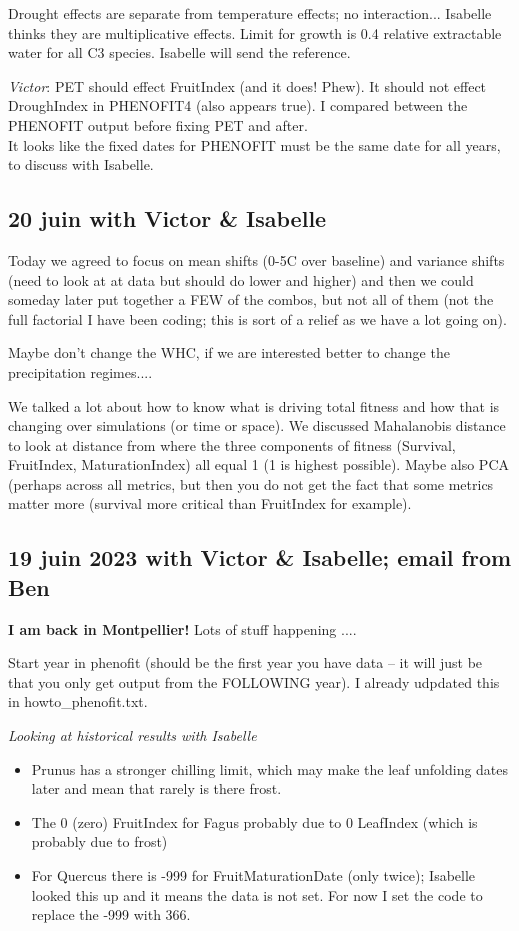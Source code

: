 \documentclass[11pt,letter]{article}
\begin{document}
Drought effects are separate from temperature effects; no interaction... Isabelle thinks they are multiplicative effects. Limit for growth is 0.4 relative extractable water for all C3 species. Isabelle will send the reference. 

\emph{Victor}:
PET should effect FruitIndex (and it does! Phew). It should not effect DroughIndex in PHENOFIT4 (also appears true). I compared between the PHENOFIT output before fixing PET and after. \\
It looks like the fixed dates for PHENOFIT must be the same date for all years, to discuss with Isabelle.\\

\subsection{20 juin with Victor \& Isabelle}

Today we agreed to focus on mean shifts (0-5C over baseline) and variance shifts (need to look at at data but should do lower and higher) and then we could someday later put together a FEW of the combos, but not all of them (not the full factorial I have been coding; this is sort of a relief as we have a lot going on). 

Maybe don't change the WHC, if we are interested better to change the precipitation regimes.... 

We talked a lot about how to know what is driving total fitness and how that is changing over simulations (or time or space). We discussed Mahalanobis distance to look at distance from where the three components of fitness (Survival, FruitIndex, MaturationIndex) all equal 1 (1 is highest possible). Maybe also PCA (perhaps across all metrics, but then you do not get the fact that some metrics matter more (survival more critical than FruitIndex for example). 

\subsection{19 juin 2023 with Victor \& Isabelle; email from Ben}

{\bf I am back in Montpellier!} Lots of stuff happening ....

Start year in phenofit (should be the first year you have data -- it will just be that you only get output from the FOLLOWING year). I already udpdated this in howto\_phenofit.txt.

\emph{Looking at historical results with Isabelle}
\begin{itemize}
\item Prunus has a stronger chilling limit, which may make the leaf unfolding dates later and mean that rarely is there frost.
\item The 0 (zero) FruitIndex for Fagus probably due to 0 LeafIndex (which is probably due to frost)
\item For Quercus there is -999 for FruitMaturationDate (only twice); Isabelle looked this up and it means the data is not set. For now I set the code to replace the -999 with 366. 
\end{itemize}
\end{document}
